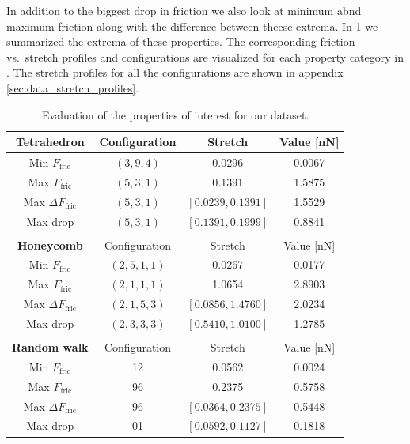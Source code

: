In addition to the biggest drop in friction we also look at minimum abnd maximum friction along with the difference between theese extrema. In \cref{tab:data_properties} we summarized the extrema of these properties. The corresponding friction vs.\ stretch profiles and configurations are visualized for each property category in . The stretch profiles for all the configurations are shown in appendix \cref{sec:data_stretch_profiles}.


\begin{table}[H]
  \begin{center}
  \caption{Evaluation of the properties of interest for our dataset.}
  \label{tab:data_properties}
  \begin{tabular}{| c | c | c | c|} \hline
  \textbf{Tetrahedron} & Configuration & Stretch & Value [nN]  \\ \hline
  Min $F_{\text{fric}}$ & $(3,9,4)$ &  0.0296 & 0.0067 \\ \hline
  Max $F_{\text{fric}}$ & $(5,3,1)$ & 0.1391 & 1.5875 \\ \hline
  Max $\Delta F_{\text{fric}}$  & $(5, 3, 1)$ & $[0.0239, 0.1391]$ & 1.5529 \\ \hline
  Max drop & $(5,3,1)$ & $[0.1391, 0.1999]$ & 0.8841 \\ \hline
  \multicolumn{4}{c}{} \\ \hline
  \textbf{Honeycomb} & Configuration & Stretch & Value [nN]  \\ \hline
  Min $F_{\text{fric}}$ & $(2, 5, 1, 1)$ &  0.0267 & 0.0177 \\ \hline
  Max $F_{\text{fric}}$ & $(2, 1, 1, 1)$ & 1.0654 & 2.8903 \\ \hline
  Max $\Delta F_{\text{fric}}$  & $(2, 1, 5, 3)$ & $[0.0856, 1.4760]$ & 2.0234 \\ \hline
  Max drop & $(2, 3, 3, 3)$ & $[0.5410, 1.0100]$ & 1.2785 \\ \hline
  \multicolumn{4}{c}{} \\ \hline
  \textbf{Random walk} & Configuration & Stretch & Value [nN]  \\ \hline
  Min $F_{\text{fric}}$ & 12 &  0.0562 & 0.0024\\ \hline
  Max $F_{\text{fric}}$ & 96 & 0.2375 & 0.5758 \\ \hline
  Max $\Delta F_{\text{fric}}$  & 96 & $[0.0364, 0.2375]$ & 0.5448 \\ \hline
  Max drop & 01 & $[0.0592, 0.1127]$ & 0.1818 \\ \hline
\end{tabular}
\end{center}
\end{table}


